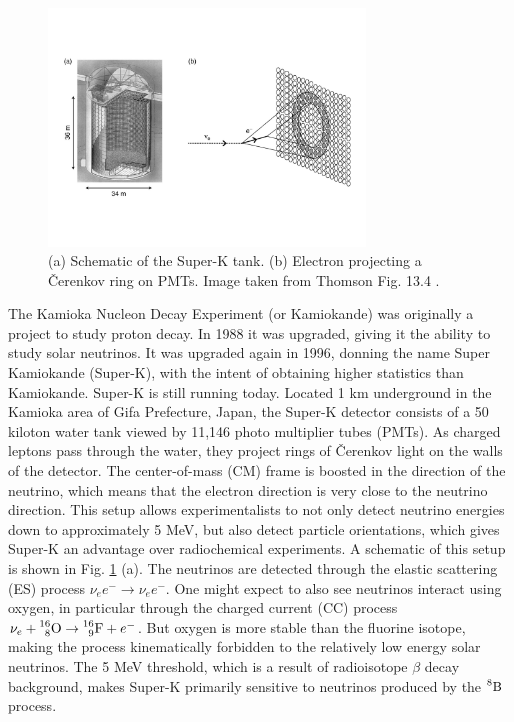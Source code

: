 \begin{figure}
  \centering
  \includegraphics[width=0.75\textwidth,keepaspectratio]
                {pictures/t13_4.pdf}
  \vspace{-10mm}
  \caption{(a) Schematic of the Super-K tank. (b) Electron
           projecting a \v{C}erenkov ring on PMTs. Image taken
           from Thomson Fig. 13.4 \cite{thomson_modern_2013}.}
  \label{fig:cerenkov}
\end{figure}

The Kamioka Nucleon Decay Experiment (or Kamiokande) was
originally a project to study proton decay. In 1988 it was
upgraded, giving it the ability to study solar neutrinos. It was upgraded
again in 1996, donning the name Super Kamiokande (Super-K), with the intent
of obtaining higher statistics than Kamiokande. Super-K is still running today.
Located 1 km underground in the Kamioka area of Gifa Prefecture, Japan,
the Super-K detector consists of a 50 kiloton water tank viewed by 11,146
photo multiplier tubes (PMTs). As charged leptons pass through the water,
they project rings of \v{C}erenkov light on the walls of the detector. The
center-of-mass (CM)
frame is boosted in the direction of the neutrino, which means that the
electron direction is very close to the neutrino direction. This setup
allows experimentalists to not only detect neutrino energies down to
approximately 5 MeV, but also detect particle orientations, which gives Super-K
an advantage over radiochemical experiments. A schematic of this setup
is shown in Fig. \ref{fig:cerenkov} (a).
The neutrinos are detected through the elastic scattering (ES) process
$\nu_ee^-\to\nu_ee^-$. One might expect to also see neutrinos interact
using oxygen, in particular through the charged current (CC) process
$\nu_e+\prescript{16}{8}{\text{O}}\to\prescript{16}{9}{\text{F}}+e^-$.
But oxygen is more stable than the fluorine isotope, making the process
kinematically forbidden to the relatively low energy solar neutrinos. The 5
MeV threshold, which is a result of radioisotope $\beta$ decay background,
 makes Super-K primarily sensitive to neutrinos produced by
the $\prescript{8}{}{\text{B}}$ process.

